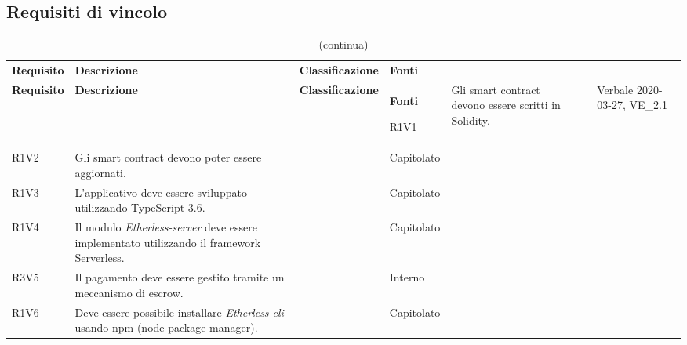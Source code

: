 \subsection{Requisiti di vincolo}

\def\arraystretch{1.75}
\begin{longtable}{ 
		>{\centering}p{} 
		>{}p{} 
		>{\centering}p{}
		>{\centering}p{} }
	
	\caption{Tabella dei requisiti di vincolo} \\ 
	\coloredTableHead
	\textbf{\color{white}Requisito} & 
	\centering\textbf{\color{white}Descrizione} & 
	\centering\textbf{\color{white}Classificazione} &
	\textbf{\color{white}Fonti} 
	\endfirsthead
	
	\caption[]{(continua)}\\
	\textbf{\color{white}Requisito} &
	\centering\textbf{\color{white}Descrizione} &
	\centering\textbf{\color{white}Classificazione} &
	\textbf{\color{white}Fonti} 
	\endhead
	
	R1V1 & Gli smart contract devono essere scritti in 
	Solidity.												& \ob & Verbale 2020-03-27, VE\_2.1\tabularnewline
	R1V2 & Gli smart contract devono poter essere aggiornati. 				& \ob & Capitolato \tabularnewline
	R1V3 & L'applicativo deve essere sviluppato utilizzando 
		TypeScript 3.6.										& \ob & Capitolato \tabularnewline
	R1V4 & Il modulo \textit{Etherless-server} deve essere implementato 
			utilizzando il framework Serverless.
												 							& \ob & Capitolato \tabularnewline
	R3V5 & Il pagamento deve essere gestito tramite un meccanismo di escrow.	& \op & Interno \tabularnewline
	R1V6 & Deve essere possibile installare \textit{Etherless-cli} 
		usando npm (node package manager).						& \ob & Capitolato \tabularnewline
	
	
\end{longtable}